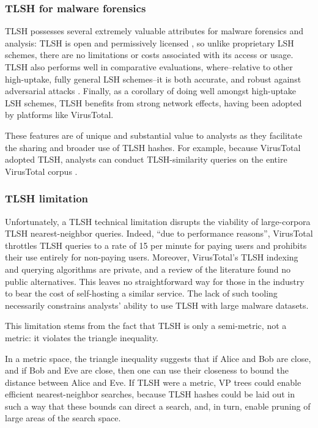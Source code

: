 \documentclass[5p,final]{elsarticle}
\begin{document}
\subsubsection{TLSH for malware forensics}

TLSH possesses several extremely valuable attributes for malware
forensics and analysis: TLSH is open and permissively licensed
\cite{oliverGitHubTrendmicroTlsh2024}, so unlike proprietary LSH schemes, there
are no limitations or costs associated with its access or usage. TLSH
also performs well in comparative evaluations, where--relative to
other high-uptake, fully general LSH schemes--it is both accurate,
and robust against adversarial attacks
\cite{oliverDesigningElementsFuzzy2021}. Finally, as a corollary of
doing well amongst high-uptake LSH schemes, TLSH benefits from strong
network effects, having been adopted by platforms like VirusTotal.

These features are of unique and substantial value to analysts as
they facilitate the sharing and broader use of TLSH hashes. For
example, because VirusTotal adopted TLSH, analysts can conduct
TLSH-similarity queries on the entire VirusTotal corpus
\cite{virustotalAdvancedCorpusSearch2024}.

\subsubsection{TLSH limitation}

Unfortunately, a TLSH technical limitation disrupts the viability of
large-corpora TLSH nearest-neighbor queries. Indeed, \enquote{due to
performance reasons}, VirusTotal throttles TLSH queries to a rate of
15 per minute for paying users and prohibits their use entirely for
non-paying users. Moreover, VirusTotal's TLSH indexing and querying
algorithms are private, and a review of the literature found no
public alternatives. This leaves no straightforward way for those in
the industry to bear the cost of self-hosting a similar service. The
lack of such tooling necessarily constrains analysts' ability to use
TLSH with large malware datasets.

This limitation stems from the fact that TLSH is only a semi-metric,
not a metric: it violates the triangle inequality.

In a metric space, the triangle inequality suggests that if Alice and
Bob are close, and if Bob and Eve are close, then one can use their
closeness to bound the distance between Alice and Eve. If TLSH were a
metric, VP trees \cite{yianilosDataStructuresAlgorithms1993} could enable
efficient nearest-neighbor searches, because TLSH hashes could be laid out
in such a way that these bounds can direct a search, and, in turn, enable
pruning of large areas of the search space.
\end{document}
